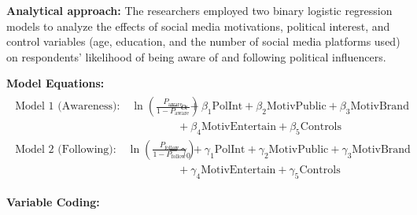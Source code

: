 \documentclass[12pt, a4paper]{article}
\begin{document}
	\textbf{Analytical approach:} The researchers employed two binary logistic regression models to analyze the effects of social media motivations, political interest, and control variables (age, education, and the number of social media platforms used) on respondents' likelihood of being aware of and following political influencers.
	
	\textbf{Model Equations:} 
	\begin{align*}
		\begin{aligned}
			\text{Model 1 (Awareness):} \quad \ln\left(\frac{P_{\text{aware}}}{1-P_{\text{aware}}}\right) &= \alpha + \beta_1 \text{PolInt} + \beta_2 \text{MotivPublic} + \beta_3 \text{MotivBrand} \\
			&\quad + \beta_4 \text{MotivEntertain} + \beta_5 \text{Controls} \\[1.5em]
			\text{Model 2 (Following):} \quad \ln\left(\frac{P_{\text{follow}}}{1-P_{\text{follow}}}\right) &= \gamma_0 + \gamma_1 \text{PolInt} + \gamma_2 \text{MotivPublic} + \gamma_3 \text{MotivBrand} \\
			&\quad + \gamma_4 \text{MotivEntertain} + \gamma_5 \text{Controls}
		\end{aligned}
	\end{align*}
	
	\textbf{Variable Coding:}
	
\end{document}
